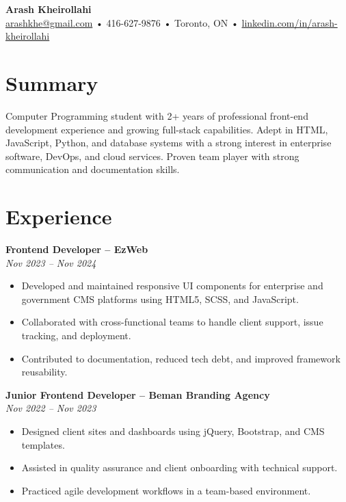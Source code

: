 \documentclass[letterpaper,11pt]{article}
\begin{document}

{\LARGE \textbf{Arash Kheirollahi}}\\
\href{mailto:arashkhe@gmail.com}{arashkhe@gmail.com} • 416-627-9876 • Toronto, ON • \href{https://linkedin.com/in/arash-kheirollahi}{linkedin.com/in/arash-kheirollahi}

\vspace{1.2em}

\section*{Summary}
Computer Programming student with 2+ years of professional front-end development experience and growing full-stack capabilities. Adept in HTML, JavaScript, Python, and database systems with a strong interest in enterprise software, DevOps, and cloud services. Proven team player with strong communication and documentation skills.

\vspace{0.6em}

\section*{Experience}
\textbf{Frontend Developer – EzWeb}\\
\textit{Nov 2023 -- Nov 2024}\\
\begin{itemize}[leftmargin=*]
  \item Developed and maintained responsive UI components for enterprise and government CMS platforms using HTML5, SCSS, and JavaScript.
  \item Collaborated with cross-functional teams to handle client support, issue tracking, and deployment.
  \item Contributed to documentation, reduced tech debt, and improved framework reusability.
\end{itemize}

\vspace{0.6em}

\textbf{Junior Frontend Developer – Beman Branding Agency}\\
\textit{Nov 2022 -- Nov 2023}\\
\begin{itemize}[leftmargin=*]
  \item Designed client sites and dashboards using jQuery, Bootstrap, and CMS templates.
  \item Assisted in quality assurance and client onboarding with technical support.
  \item Practiced agile development workflows in a team-based environment.
\end{itemize}
\end{document}
